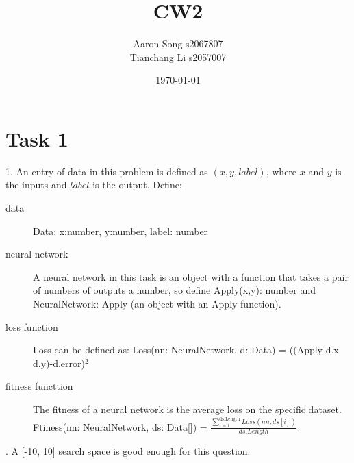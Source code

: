 \documentclass[12pt]{article}
\author{Aaron Song s2067807\\Tianchang Li s2057007}
\title{CW2}
\date{\today}
\begin{document}
\maketitle



\section{Task 1}

1. An entry of data in this problem is defined as $(x,y,label)$, where $x$ and $y$ is the inputs and $label$ is the output. Define:
\begin{description}
    \item[data] Data: x:number, y:number, label: number
    \item[neural network] A neural network in this task is an object with a function that takes a pair of numbers of outputs a number, so define Apply(x,y): number and NeuralNetwork: { Apply } (an object with an Apply function).
    \item[loss function] Loss can be defined as: Loss(nn: NeuralNetwork, d: Data) = ((Apply d.x d.y)-d.error)$^2$
    \item[fitness functtion] The fitness of a neural network is the average loss on the specific dataset. 
    Ftiness(nn: NeuralNetwork, ds: Data[]) = $\frac{\sum_{i=1}^{\textrm{ds.Length}}Loss(nn, ds[i])}{ds.Length}$
\end{description}

. A [-10, 10] search space is good enough for this question.
\end{document}
